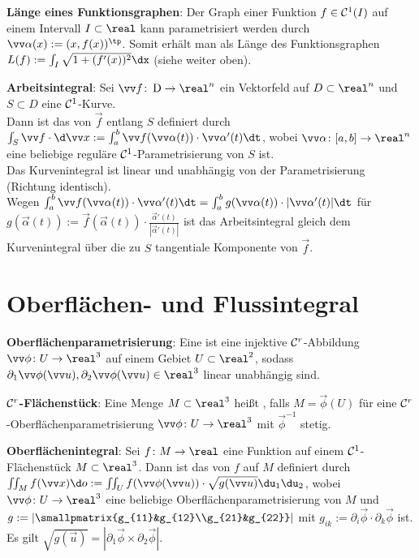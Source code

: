 \textbf{Länge eines Funktionsgraphen}:
Der Graph einer Funktion $f \in \mathcal{C}^1(I)$ auf einem Intervall $I \subset \real$
kann parametrisiert werden durch $\vec{\alpha}(x) := (x, f(x))^\tp$.
Somit erhält man als Länge des Funktionsgraphen $L(f) := \int_I \sqrt{1 + (f'(x))^2} \dx$
(siehe weiter oben).

\linie

\textbf{Arbeitsintegral}:
Sei $\vec{f}\colon \D \to \real^n$ ein Vektorfeld auf $D \subset \real^n$
und $S \subset D$ eine $\mathcal{C}^1$-Kurve.\\
Dann ist das  von $\vec{f}$ entlang $S$ definiert durch
$\int_S \vec{f} \cdot \d\vec{x} := \int_a^b \vec{f}(\vec{\alpha}(t)) \cdot \vec{\alpha}'(t) \dt$,
wobei $\vec{\alpha}\colon [a, b] \to \real^n$ eine beliebige reguläre $\mathcal{C}^1$-Parametrisierung von
$S$ ist.\\
Das Kurvenintegral ist linear und unabhängig von der Parametrisierung
(Richtung identisch).\\
Wegen $\int_a^b \vec{f}(\vec{\alpha}(t)) \cdot \vec{\alpha}'(t) \dt
= \int_a^b g(\vec{\alpha}(t)) \cdot |\vec{\alpha}'(t)| \dt$
für $g(\vec{\alpha}(t))
:= \vec{f}(\vec{\alpha}(t)) \cdot \frac{\vec{\alpha}'(t)}{|\vec{\alpha}'(t)|}$
ist das Arbeitsintegral gleich dem Kurvenintegral über die zu $S$ tangentiale Komponente von
$\vec{f}$.

\pagebreak

\section{%
    Oberflächen- und Flussintegral%
}

\textbf{Oberflächenparametrisierung}:
Eine  ist eine injektive $\mathcal{C}^r$-Abbildung
$\vec{\phi}\colon U \to \real^3$ auf einem Gebiet $U \subset \real^2$,
sodass $\partial_1 \vec{\phi}(\vec{u}), \partial_2 \vec{\phi}(\vec{u}) \in \real^3$
linear unabhängig sind.

\textbf{$\mathcal{C}^r$-Flächenstück}:
Eine Menge $M \subset \real^3$ heißt , falls
$M = \vec{\phi}(U)$ für eine $\mathcal{C}^r$-Oberflächenparametrisierung $\vec{\phi}\colon U \to \real^3$
mit $\vec{\phi}^{-1}$ stetig.

\linie

\textbf{Oberflächenintegral}:
Sei $f\colon M \to \real$ eine Funktion auf einem $\mathcal{C}^1$-Flächenstück $M \subset \real^3$.
Dann ist das  von $f$ auf $M$ definiert durch\\
$\iint_M f(\vec{x}) \d o := \iint_U f(\vec{\phi}(\vec{u})) \cdot \sqrt{g(\vec{u})} \du_1 \du_2$,
wobei $\vec{\phi}\colon U \to \real^3$ eine beliebige Oberflächenparametrisierung von $M$ und
$g := \left|\smallpmatrix{g_{11}&g_{12}\\g_{21}&g_{22}}\right|$ mit
$g_{ik} := \partial_i \vec{\phi} \cdot \partial_k \vec{\phi}$ ist.
Es gilt $\sqrt{g(\vec{u})} = |\partial_1 \vec{\phi} \times \partial_2 \vec{\phi}|$.

